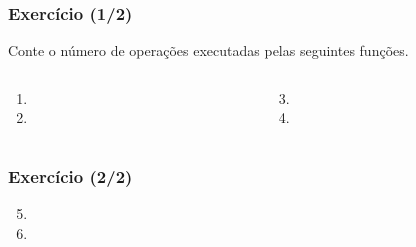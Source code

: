 \documentclass[aspectratio=169]{beamer}
\begin{document}
\begin{frame}[fragile]\frametitle{Exercício (1/2)}
Conte o número de operações executadas pelas seguintes funções.
\begin{columns}[T]
\begin{column}{0.5\linewidth}
\begin{enumerate}
	\item {\scriptsize}
	\item {\scriptsize}
\end{enumerate}
\end{column}
\begin{column}{0.5\linewidth}
\begin{enumerate}
	\setcounter{enumi}{2}
	\item {\scriptsize}
	\item {\scriptsize}
\end{enumerate}
\end{column}
\end{columns}
\end{frame}

\begin{frame}[fragile]\frametitle{Exercício (2/2)}
\begin{enumerate}
	\setcounter{enumi}{4}
	\item {\scriptsize}
	\item {\scriptsize}
\end{enumerate}
\end{frame}
\end{document}
